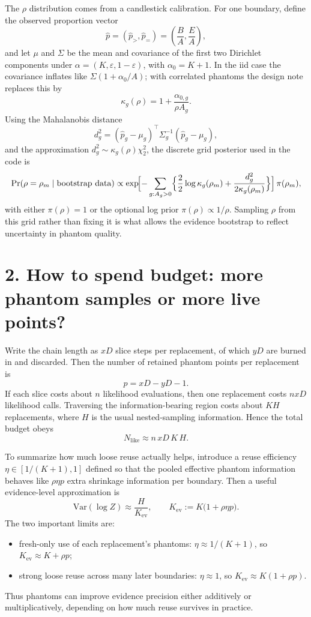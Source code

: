 \documentclass[10pt]{article}
\begin{document}
The $\rho$ distribution comes from a candlestick calibration. For one boundary, define the observed proportion vector
\[
\hat p = (\hat p_>,\hat p_=)=\left(\frac{B}{A},\frac{E}{A}\right),
\]
and let $\mu$ and $\Sigma$ be the mean and covariance of the first two Dirichlet components under $\alpha=(K,\varepsilon,1-\varepsilon)$, with $\alpha_0=K+1$. In the iid case the covariance inflates like $\Sigma(1+\alpha_0/A)$; with correlated phantoms the design note replaces this by
\[
\kappa_g(\rho)=1+\frac{\alpha_{0,g}}{\rho A_g}.
\]
Using the Mahalanobis distance
\[
d_g^2=(\hat p_g-\mu_g)^\top \Sigma_g^{-1}(\hat p_g-\mu_g),
\]
and the approximation $d_g^2\sim \kappa_g(\rho)\chi_2^2$, the discrete grid posterior used in the code is
\[
\Pr(\rho=\rho_m\mid \text{bootstrap data}) \propto
\exp\!\Bigl[-\sum_{g:A_g>0}\Bigl\{\frac{2}{2}\log \kappa_g(\rho_m)+\frac{d_g^2}{2\kappa_g(\rho_m)}\Bigr\}\Bigr]\,\pi(\rho_m),
\]
with either $\pi(\rho)=1$ or the optional log prior $\pi(\rho)\propto 1/\rho$. Sampling $\rho$ from this grid rather than fixing it is what allows the evidence bootstrap to reflect uncertainty in phantom quality.

\section*{2. How to spend budget: more phantom samples or more live points?}

Write the chain length as $xD$ slice steps per replacement, of which $yD$ are burned in and discarded. Then the number of retained phantom points per replacement is
\[
p = xD-yD-1.
\]
If each slice costs about $n$ likelihood evaluations, then one replacement costs $nxD$ likelihood calls. Traversing the information-bearing region costs about $KH$ replacements, where $H$ is the usual nested-sampling information. Hence the total budget obeys
\[
N_{\mathrm{like}}\approx n\,xD\,K\,H.
\]

To summarize how much loose reuse actually helps, introduce a reuse efficiency $\eta\in[1/(K+1),1]$ defined so that the pooled effective phantom information behaves like $\rho\eta p$ extra shrinkage information per boundary. Then a useful evidence-level approximation is
\[
\boxed{\;\mathrm{Var}(\log Z)\approx \frac{H}{K_{\mathrm{ev}}},\qquad
K_{\mathrm{ev}}:=K\bigl(1+\rho\eta p\bigr).\;}
\]
The two important limits are:
\begin{itemize}
    \item fresh-only use of each replacement's phantoms: $\eta\approx 1/(K+1)$, so $K_{\mathrm{ev}}\approx K+\rho p$;
    \item strong loose reuse across many later boundaries: $\eta\approx 1$, so $K_{\mathrm{ev}}\approx K(1+\rho p)$.
\end{itemize}
Thus phantoms can improve evidence precision either additively or multiplicatively, depending on how much reuse survives in practice.
\end{document}
